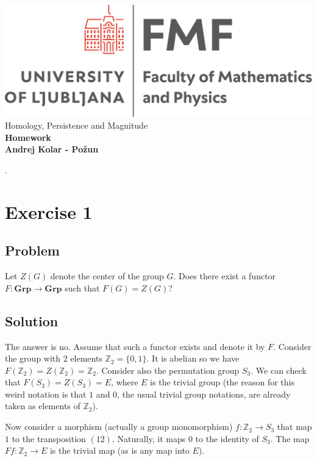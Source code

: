 \documentclass{article}
\begin{document}

\begin{titlepage}
    \begin{center}
        \vspace*{1cm}
        \Large
\includegraphics[width=.8\linewidth]{fmflogo.pdf}\\
        \Large
\vspace{3cm}
        Homology, Persistence and Magnitude\\
        \huge
        \textbf{Homework \\}
\Large  
        \vspace{1cm}
        \textbf{Andrej Kolar - Po{\v z}un\\}


\vfill
\normalsize
\end{center}. 
\end{titlepage}

\newpage
{}
\section*{Exercise 1}
\subsection*{Problem}
Let $Z(G)$ denote the center of the group $G$. Does there exist a functor $F: \mathbf{Grp} \to \mathbf{Grp}$ such that $F(G) = Z(G)$?
\subsection*{Solution}
The answer is no. Assume that such a functor exists and denote it by $F$. Consider the group with 2 elements $\mathbb{Z}_2 = \{0, 1\}$. It is abelian so we have $F(\mathbb{Z}_2) = Z(\mathbb{Z}_2) = \mathbb{Z}_2$. Consider also the permutation group $S_3$. We can check that $F(S_3) = Z(S_3) = E$, where $E$ is the trivial group (the reason for this weird notation is that $1$ and $0$, the usual trivial group notations, are already taken as elements of $\mathbb{Z}_2$).

Now consider a morphism (actually a group monomorphism) $f: \mathbb{Z}_2 \to S_3$ that map $1$ to the transposition $(1 2)$.
Naturally, it maps $0$ to the identity of $S_3$. The map $Ff: \mathbb{Z}_2 \to E$ is the trivial map (as is any map into $E$).
\end{document}
